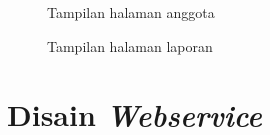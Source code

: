 \begin{figure}
\centering
{}
\caption[Tampilan halaman anggota]{Tampilan halaman anggota} 
\label{fig:design_web_anggota_rumah_tangga}
\end{figure}

\begin{figure}
\centering
{}
\caption[Tampilan halaman laporan]{Tampilan halaman laporan} 
\label{fig:design_web_laporan_rumah_tangga}
\end{figure}

\section{Disain \textit{Webservice}}


